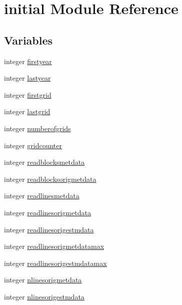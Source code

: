 \hypertarget{namespaceinitial}{}\section{initial Module Reference}
\label{namespaceinitial}
\subsection*{Variables}
\begin{DoxyCompactItemize}
\item 
integer \hyperlink{namespaceinitial_abea65826f68b663575b9a8373cce36e6}{firstyear}
\item 
integer \hyperlink{namespaceinitial_aacf5b4e12c32955da088ba130fe9588a}{lastyear}
\item 
integer \hyperlink{namespaceinitial_aa3cbd56e6d33e03dc03b7b5fd49b98f6}{firstgrid}
\item 
integer \hyperlink{namespaceinitial_a247bedafc3b9e5b5074be3df3c622439}{lastgrid}
\item 
integer \hyperlink{namespaceinitial_a8b597530437378547375fd052f654b6d}{numberofgrids}
\item 
integer \hyperlink{namespaceinitial_a285aa78da8f73cb954b61021b9761efc}{gridcounter}
\item 
integer \hyperlink{namespaceinitial_a54d1c6370c32660f5e42047474ab1aa8}{readblocksmetdata}
\item 
integer \hyperlink{namespaceinitial_aff81954b2154ea7014aad6d95ef548f9}{readblocksorigmetdata}
\item 
integer \hyperlink{namespaceinitial_a15660cbc94e90ad74cdc75f0c1e9fb14}{readlinesmetdata}
\item 
integer \hyperlink{namespaceinitial_ace32d965c8c765abd9b056bff91a8f87}{readlinesorigmetdata}
\item 
integer \hyperlink{namespaceinitial_ad6e88b75e3208b4d643379dddca2a642}{readlinesorigestmdata}
\item 
integer \hyperlink{namespaceinitial_ad101a761c07af352d00a800877772fd7}{readlinesorigmetdatamax}
\item 
integer \hyperlink{namespaceinitial_acae158b3f7e930f70e6dd66bfc155993}{readlinesorigestmdatamax}
\item 
integer \hyperlink{namespaceinitial_a6340087c9b63ab9063c64b890941fabd}{nlinesorigmetdata}
\item 
integer \hyperlink{namespaceinitial_aa63293cecb7c4a1c022b040f9e01e949}{nlinesorigestmdata}
\item 

\end{DoxyCompactItemize}
